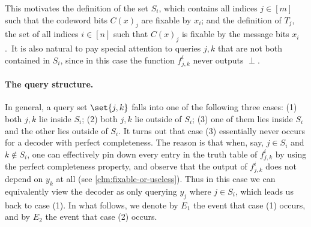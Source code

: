 This motivates the definition of the set $S_i$, which contains all indices $j \in [m]$ such that the codeword bits $C(x)_j$ are fixable by $x_i$; and the definition of $T_j$, the set of all indices $i \in [n]$ such that $C(x)_j$ is fixable by the message bits $x_i$.\ It is also natural to pay special attention to queries $j,k$ that are not both contained in $S_i$, since in this case the function $f_{j,k}^{i}$ never outputs $\perp$.

\paragraph{The query structure.} In general, a query set $\set{j,k}$ falls into one of the following three cases: (1) both $j,k$ lie inside $S_i$; (2) both $j,k$ lie outside of $S_i$; (3) one of them lies inside $S_i$ and the other lies outside of $S_i$. It turns out that case (3) essentially never occurs for a decoder with perfect completeness. The reason is that when, say, $j \in S_i$ and $k \notin S_i$, one can effectively pin down every entry in the truth table of $f_{j,k}^{i}$ by using the perfect completeness property, and observe that the output of $f_{j,k}^{i}$ does not depend on $y_k$ at all (see \cref{clm:fixable-or-useless}). Thus in this case we can equivalently view the decoder as only querying $y_j$ where $j \in S_i$, which leads us back to case (1). In what follows, we denote by $E_1$ the event that case (1) occurs, and by $E_2$ the event that case (2) occurs.

